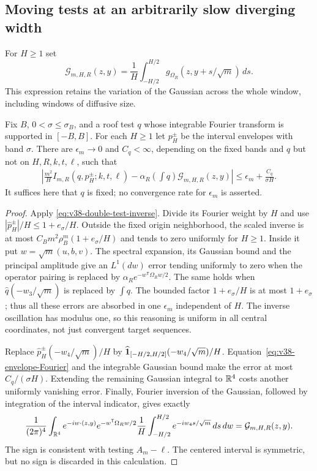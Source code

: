 \subsection{Moving tests at an arbitrarily slow diverging width}
For $H\ge1$ set
\begin{equation}\label{eq:v38-Gaussian-window}
 \mathcal G_{m,H,R}(z,y)=\frac1H\int_{-H/2}^{H/2}
           g_{\Omega_R}(z,y+s/\sqrt m)\,ds.
\end{equation}
This expression retains the variation of the Gaussian across the
whole window, including windows of diffusive size.

\begin{lemma}
\label{lem:v38-moving-envelope}
Fix $B$, $0<\sigma\le\sigma_B$, and a roof test $q$ whose integrable
Fourier transform is supported in $[-B,B]$. For each $H\ge1$ let
$p_H^\pm$ be the interval envelopes with band $\sigma$. There are
$\epsilon_m\to0$ and $C_q<\infty$, depending on the fixed bands and
$q$ but not on $H,R,k,t,\ell$, such that
\begin{align}\label{eq:v38-moving-envelope}
 \left|\frac{m^2}{H}I_{m,R}(q,p_H^\pm;k,t,\ell)
       -\alpha_R\left(\int q\right)\mathcal G_{m,H,R}(z,y)\right|
       \le \epsilon_m+\frac{C_q}{\sigma H}.
\end{align}
It suffices here that $q$ is fixed; no convergence rate for
$\epsilon_m$ is asserted.
\end{lemma}
\begin{proof}
Apply \eqref{eq:v38-double-test-inverse}. Divide its Fourier weight by
$H$ and use $|\widehat p_H^\pm|/H\le1+e_\sigma/H$.
Outside the fixed origin neighborhood, the scaled inverse is at most
$C_Bm^2\rho_B^m(1+e_\sigma/H)$ and tends to zero uniformly for
$H\ge1$. Inside it put $w=\sqrt m(u,b,v)$. The spectral expansion,
its Gaussian bound and the principal amplitude give an $L^1(dw)$
error tending uniformly to zero when the operator pairing is replaced
by $\alpha_Re^{-w^{\mathsf T}\Omega_Rw/2}$. The same holds when
$\widehat q(-w_3/\sqrt m)$ is replaced by $\int q$. The bounded
factor $1+e_\sigma/H$ is at most $1+e_\sigma$; thus all these errors
are absorbed in one $\epsilon_m$ independent of $H$. The inverse
oscillation has modulus one, so this reasoning is uniform in all
central coordinates, not just convergent target sequences.

Replace $\widehat p_H^\pm(-w_4/\sqrt m)/H$ by
$\widehat{\mathbf1}_{[-H/2,H/2]}(-w_4/\sqrt m)/H$.
Equation~\eqref{eq:v38-envelope-Fourier} and the integrable Gaussian
bound make the error at most $C_q/(\sigma H)$. Extending the remaining
Gaussian integral to $\mathbb R^4$ costs another uniformly vanishing error.
Finally, Fourier inversion of the Gaussian, followed by integration
of the interval indicator, gives exactly
\[
 \frac1{(2\pi)^4}\int_{\mathbb R^4}e^{-iw\cdot(z,y)}
 e^{-w^{\mathsf T}\Omega_Rw/2}
 \frac1H\int_{-H/2}^{H/2}e^{-iw_4s/\sqrt m}\,ds\,dw
       =\mathcal G_{m,H,R}(z,y).
\]
The sign is consistent with testing $A_m-\ell$. The centered interval
is symmetric, but no sign is discarded in this calculation.
\end{proof}

